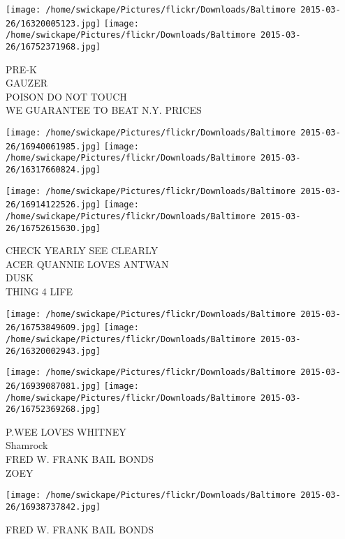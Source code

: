 \documentclass[10pt,letterpaper]{article}
\begin{document}
\texttt{[image: /home/swickape/Pictures/flickr/Downloads/Baltimore 2015-03-26/16320005123.jpg]}
\texttt{[image: /home/swickape/Pictures/flickr/Downloads/Baltimore 2015-03-26/16752371968.jpg]}

PRE{-}K\\
GAUZER\\
POISON DO NOT TOUCH\\
WE GUARANTEE TO BEAT N.Y. PRICES\\
\pagebreak

\texttt{[image: /home/swickape/Pictures/flickr/Downloads/Baltimore 2015-03-26/16940061985.jpg]}
\texttt{[image: /home/swickape/Pictures/flickr/Downloads/Baltimore 2015-03-26/16317660824.jpg]}

\texttt{[image: /home/swickape/Pictures/flickr/Downloads/Baltimore 2015-03-26/16914122526.jpg]}
\texttt{[image: /home/swickape/Pictures/flickr/Downloads/Baltimore 2015-03-26/16752615630.jpg]}

CHECK YEARLY SEE CLEARLY\\
ACER QUANNIE LOVES ANTWAN\\
DUSK\\
THING 4 LIFE\\
\pagebreak

\texttt{[image: /home/swickape/Pictures/flickr/Downloads/Baltimore 2015-03-26/16753849609.jpg]}
\texttt{[image: /home/swickape/Pictures/flickr/Downloads/Baltimore 2015-03-26/16320002943.jpg]}

\texttt{[image: /home/swickape/Pictures/flickr/Downloads/Baltimore 2015-03-26/16939087081.jpg]}
\texttt{[image: /home/swickape/Pictures/flickr/Downloads/Baltimore 2015-03-26/16752369268.jpg]}

P.WEE LOVES WHITNEY\\
Shamrock\\
FRED W. FRANK BAIL BONDS\\
ZOEY\\
\pagebreak

\texttt{[image: /home/swickape/Pictures/flickr/Downloads/Baltimore 2015-03-26/16938737842.jpg]}

FRED W. FRANK BAIL BONDS\\
\pagebreak
\end{document}
